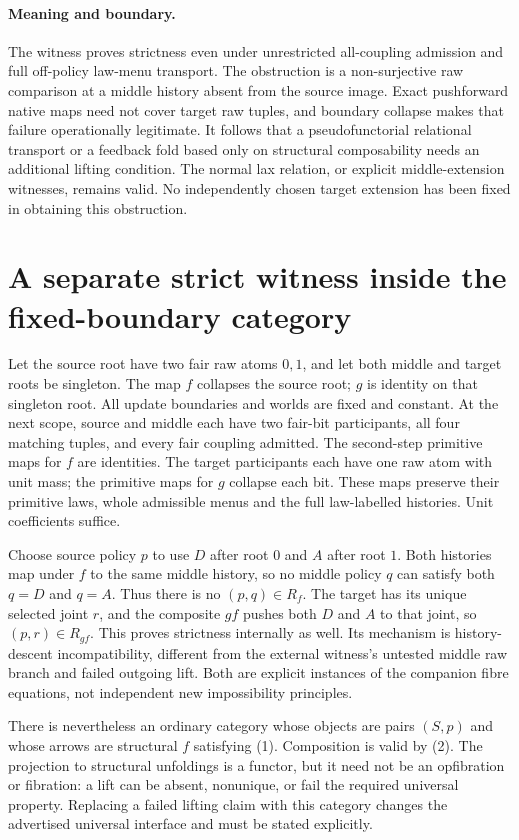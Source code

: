 \documentclass[11pt]{article}
\begin{document}
\paragraph{Meaning and boundary.}
The witness proves strictness even under unrestricted all-coupling admission and full off-policy law-menu transport. The obstruction is a non-surjective raw comparison at a middle history absent from the source image. Exact pushforward native maps need not cover target raw tuples, and boundary collapse makes that failure operationally legitimate. It follows that a pseudofunctorial relational transport or a feedback fold based only on structural composability needs an additional lifting condition. The normal lax relation, or explicit middle-extension witnesses, remains valid. No independently chosen target extension has been fixed in obtaining this obstruction.

\section{A separate strict witness inside the fixed-boundary category}
Let the source root have two fair raw atoms $0,1$, and let both middle and target roots be singleton. The map $f$ collapses the source root; $g$ is identity on that singleton root. All update boundaries and worlds are fixed and constant. At the next scope, source and middle each have two fair-bit participants, all four matching tuples, and every fair coupling admitted. The second-step primitive maps for $f$ are identities. The target participants each have one raw atom with unit mass; the primitive maps for $g$ collapse each bit. These maps preserve their primitive laws, whole admissible menus and the full law-labelled histories. Unit coefficients suffice.

Choose source policy $p$ to use $D$ after root $0$ and $A$ after root $1$. Both histories map under $f$ to the same middle history, so no middle policy $q$ can satisfy both $q=D$ and $q=A$. Thus there is no $(p,q)\in R_f$. The target has its unique selected joint $r$, and the composite $gf$ pushes both $D$ and $A$ to that joint, so $(p,r)\in R_{gf}$. This proves strictness internally as well. Its mechanism is history-descent incompatibility, different from the external witness's untested middle raw branch and failed outgoing lift. Both are explicit instances of the companion fibre equations, not independent new impossibility principles.

There is nevertheless an ordinary category whose objects are pairs $(S,p)$ and whose arrows are structural $f$ satisfying (1). Composition is valid by (2). The projection to structural unfoldings is a functor, but it need not be an opfibration or fibration: a lift can be absent, nonunique, or fail the required universal property. Replacing a failed lifting claim with this category changes the advertised universal interface and must be stated explicitly.
\end{document}
